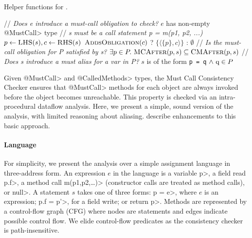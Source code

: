 \begin{algorithm}[h]
  \caption{Helper functions for . 
}
  \label{alg:helpers}
  \begin{algorithmic}[1]
  \State // \textit{Does e introduce a must-call obligation to check?}
  \State \Return $e$ has non-empty \<@MustCall> type
  \EndProcedure
  \State // \textit{s must be a call statement p = m(p1, p2, ...)}
  \State $p \gets \textsc{LHS}(s), c \gets \textsc{RHS}(s)$
  \State \Return $\textsc{AddsObligation}(c)$ ? $\{ \langle \{ p \}, c
  \rangle \}$ : $\emptyset$
  \EndProcedure
  \State // \textit{Is the must-call obligation for P satisfied by
    s?}
  \State \Return $\exists p \in P .\ \textsc{MCAfter}(p,s) \subseteq \textsc{CMAfter}(p,s)$
  \EndProcedure
  \State // \textit{Does s introduce a must alias for a var in P?}
    \State \Return $s$ is of the form \lstinline{p = q} $\wedge\ \lstinline{q} \in P$
  \EndProcedure
  \end{algorithmic}

\end{algorithm}

Given \<@MustCall> and \<@CalledMethods> types, the Must
Call Consistency Checker ensures that \<@MustCall> methods for each object
are always invoked before the object becomes unreachable.  This property is
checked via an intra-procedural dataflow analysis.  Here, we present
a simple, sound version of the analysis, with limited reasoning about aliasing.
describe enhancements to this basic approach.

\paragraph{Language} For simplicity, we present the analysis over a simple
assignment language in three-address form.  An expression $e$ in the language is
a variable \<p>, a field read \<p.f>, a method call \<m(p1,p2,\ldots)> (constructor
calls are treated as method calls), or \<null>.  A statement $s$ takes one of three forms:
\<p = e>, where $e$ is an expression; \<p.f = p'>, for a field write; or
\<return p>.  Methods are represented by a control-flow graph (CFG) where nodes
are statements and edges indicate possible control flow.  We elide control-flow
predicates as the consistency checker is path-insensitive. 

